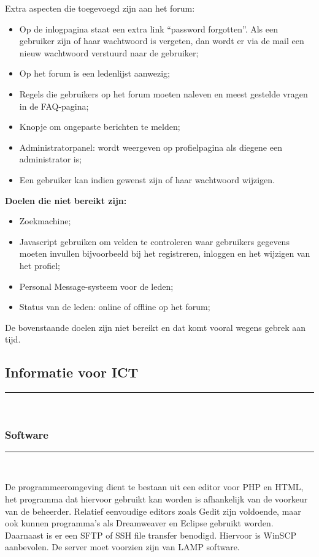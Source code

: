 \documentclass[a4paper,12pt]{article}
\newcommand{\HRule}{\rule{\linewidth}{0.5mm}}
\begin{document}
Extra aspecten die toegevoegd zijn aan het forum:
\begin{itemize}
\item Op de inlogpagina staat een extra link “password forgotten”. Als een gebruiker zijn of haar wachtwoord is vergeten, dan wordt er via de mail een nieuw wachtwoord verstuurd naar de gebruiker;
\item Op het forum is een ledenlijst aanwezig;
\item Regels die gebruikers op het forum moeten naleven en meest gestelde vragen in de FAQ-pagina;
\item Knopje om ongepaste berichten te melden;
\item Administratorpanel: wordt weergeven op profielpagina als diegene een administrator is;
\item Een gebruiker kan indien gewenst zijn of haar wachtwoord wijzigen.
\end{itemize}
{\bfseries Doelen die niet bereikt zijn:}
\begin{itemize}
\item Zoekmachine;
\item Javascript gebruiken om velden te controleren waar gebruikers gegevens moeten invullen bijvoorbeeld bij het registreren, inloggen en het wijzigen van het profiel;
\item Personal Message-systeem voor de leden;
\item Status van de leden: online of offline op het forum;
\end{itemize}

De bovenstaande doelen zijn niet bereikt en dat komt vooral wegens gebrek aan tijd.


\newpage
\begin{center}
\part[Informatie voor ICT]{Informatie voor ICT}
\HRule \\[0.5cm]
\end{center}


\begin{center}
\section[Software]{Software}
\HRule \\[0.5cm]
\end{center}
De programmeeromgeving dient te bestaan uit een editor voor PHP en HTML, het programma dat hiervoor gebruikt kan worden is afhankelijk van de voorkeur van de beheerder. Relatief eenvoudige editors zoals Gedit zijn voldoende, maar ook kunnen programma's als Dreamweaver en Eclipse gebruikt worden. Daarnaast is er een SFTP of SSH file transfer benodigd. Hiervoor is WinSCP aanbevolen. De server moet voorzien zijn van LAMP software.
\end{document}
